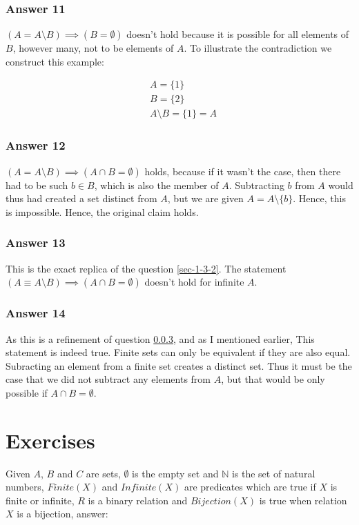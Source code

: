\documentclass[11pt]{article}
\begin{document}
\subsubsection{Answer 11}
\label{sec-1-4-1}
$(A = A \setminus B) \implies (B = \emptyset)$ doesn't hold because it is
possible for all elements of $B$, however many, not to be elements of $A$.
To illustrate the contradiction we construct this example:

\begin{equation}
\begin{split}
& A = \{1\} \\
& B = \{2\} \\
& A \setminus B = \{1\} = A
\end{split}
\end{equation}
\subsubsection{Answer 12}
\label{sec-1-4-2}
$(A = A \setminus B) \implies (A \cap B = \emptyset)$ holds, because if
it wasn't the case, then there had to be such $b \in B$, which is also the
member of $A$.  Subtracting $b$ from $A$ would thus had created a set
distinct from $A$, but we are given $A = A \setminus \{b\}$.  Hence, this
is impossible.  Hence, the original claim holds.
\subsubsection{Answer 13}
\label{sec-1-4-3}
This is the exact replica of the question \ref{sec-1-3-2}. The statement 
$(A \equiv A \setminus B) \implies (A \cap B = \emptyset)$ doesn't hold for
infinite $A$.
\subsubsection{Answer 14}
\label{sec-1-4-4}
As this is a refinement of question \ref{sec-1-4-3}, and as I mentioned earlier,
This statement is indeed true.  Finite sets can only be equivalent if they
are also equal.  Subracting an element from a finite set creates a distinct
set.  Thus it must be the case that we did not subtract any elements from
$A$, but that would be only possible if $A \cap B = \emptyset$.
\section{Exercises}
\label{sec-2}
Given $A$, $B$ and $C$ are sets, $\emptyset$ is the empty set and $\mathbb{N}$
is the set of natural numbers, $Finite(X)$ and $Infinite(X)$ are predicates
which are true if $X$ is finite or infinite, $R$ is a binary relation and
$Bijection(X)$ is true when relation $X$ is a bijection, answer:
\end{document}
